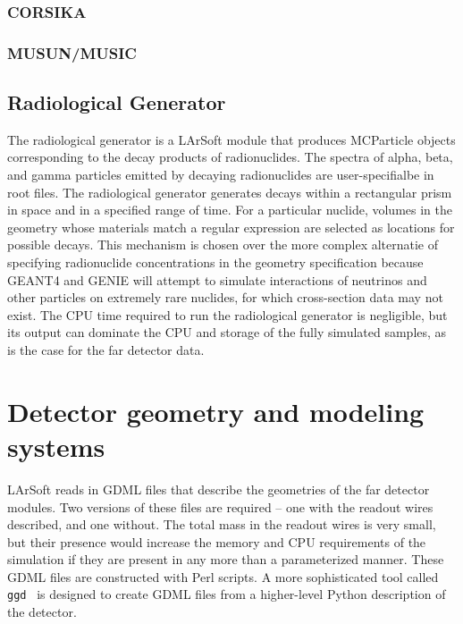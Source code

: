 \subsubsection{CORSIKA}

\subsubsection{MUSUN/MUSIC}  %

\subsection{Radiological Generator}

The radiological generator is a LArSoft module that produces MCParticle objects corresponding
to the decay products of radionuclides.  The spectra of alpha, beta, and gamma particles emitted
by decaying radionuclides are user-specifialbe in root files.  The radiological generator generates
decays within a rectangular prism in space and in a specified range of time.  For a particular
nuclide, volumes in the geometry whose materials match a regular expression are selected as locations
for possible decays.  This mechanism is chosen over the more complex alternatie of specifying radionuclide
concentrations in the geometry specification because GEANT4 and GENIE will attempt to simulate interactions
of neutrinos and other particles on extremely rare nuclides, for which cross-section data may not exist.
The CPU time required to run the radiological generator is negligible, but its output can dominate
the CPU and storage of the fully simulated samples, as is the case for the far detector data.

\section{Detector geometry and modeling systems}

LArSoft reads in GDML files that describe the geometries of the far detector modules.  Two versions of these
files are required -- one with the readout wires described, and one without.  The total mass in the readout
wires is very small, but their presence would increase the memory and CPU requirements of the simulation
if they are present in any more than a parameterized manner.  These GDML files are constructed with Perl scripts.
A more sophisticated tool called {\tt{ggd}}~\cite{ggd} is designed to create GDML files from a higher-level
Python description of the detector.

